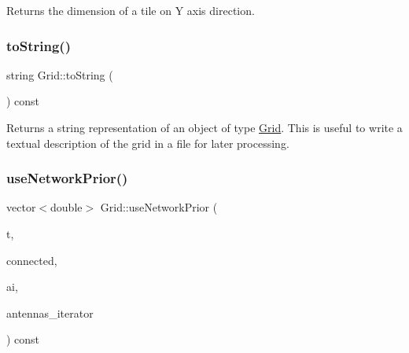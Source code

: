 \begin{DoxyReturn}{Returns}
the dimension of a tile on Y axis direction. 
\end{DoxyReturn}
\mbox{\label{class_grid_ad48d195b5e333a94a3a14d6395252b2a}} 
\subsubsection{\texorpdfstring{to\+String()}{toString()}}
{\footnotesize\ttfamily string Grid\+::to\+String (\begin{DoxyParamCaption}{ }\end{DoxyParamCaption}) const}

\begin{DoxyReturn}{Returns}
a string representation of an object of type \hyperlink{class_grid}{Grid}. This is useful to write a textual description of the grid in a file for later processing. 
\end{DoxyReturn}
\mbox{\label{class_grid_a4bd2091f95030e86b78e7be903667e06}} 
\subsubsection{\texorpdfstring{use\+Network\+Prior()}{useNetworkPrior()}}
{\footnotesize\ttfamily vector$<$double$>$ Grid\+::use\+Network\+Prior (\begin{DoxyParamCaption}\item[{unsigned long}]{t,  }\item[{bool}]{connected,  }\item[{vector$<$ \hyperlink{class_antenna_info}{Antenna\+Info} $>$\+::iterator}]{ai,  }\item[{pair$<$ \hyperlink{_agents_collection_8h_afde47bc45d604b8b8c72755072376679}{um\+\_\+iterator}, \hyperlink{_agents_collection_8h_afde47bc45d604b8b8c72755072376679}{um\+\_\+iterator} $>$}]{antennas\+\_\+iterator }\end{DoxyParamCaption}) const\hspace{0.3cm}{\ttfamily [private]}}

\mbox{\label{class_grid_ac77c744828c5cf70dd5650217475e25b}} 
